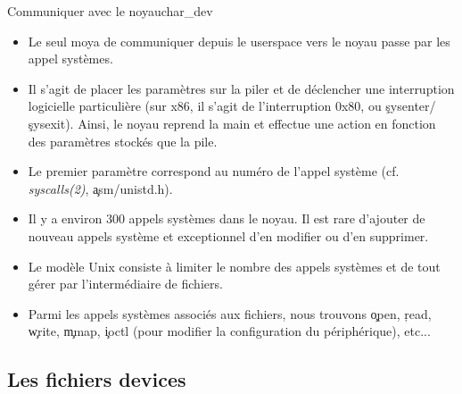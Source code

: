 \begin{frame}[fragile=singleslide]{Communiquer avec le noyau}{char\_dev}
  \begin{itemize} 
  \item Le seul moya de  communiquer depuis le userspace vers le noyau
    passe par les appel systèmes.
  \item  Il  s'agit  de placer  les  paramètres  sur  la piler  et  de
    déclencher une  interruption logicielle particulière  (sur x86, il
    s'agit         de          l'interruption         0x80,         ou
    \c{sysenter}/\c{sysexit}).  Ainsi,  le noyau  reprend  la main  et
    effectue  une action  en fonction  des paramètres  stockés  que la
    pile.
  \item Le  premier paramètre correspond au numéro  de l'appel système
    (cf.  \emph{syscalls(2)}, \c{asm/unistd.h}).
  \item Il y a environ 300  appels systèmes dans le noyau. Il est rare
    d'ajouter de nouveau appels système et exceptionnel d'en modifier ou
    d'en supprimer.
  \item  Le  modèle Unix  consiste  à  limiter  le nombre  des  appels
    systèmes et de tout gérer par l'intermédiaire de fichiers.
  \item  Parmi  les  appels  systèmes  associés  aux  fichiers,  nous
    trouvons \c{open}, \c{read},  \c{write}, \c{mmap}, \c{ioctl} (pour
    modifier la configuration du périphérique), etc...
  \end{itemize}
\end{frame}

\subsection{Les fichiers devices}

